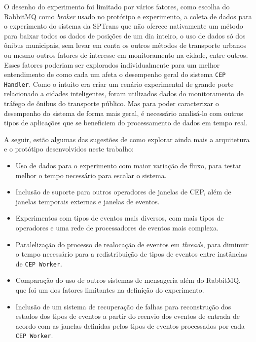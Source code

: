 O desenho do experimento foi limitado por vários fatores, como escolha do RabbitMQ como \textit{broker} usado no protótipo e experimento, a coleta de dados para o experimento do sistema da SPTrans que não oferece nativamente um método para baixar todos os dados de posições de um dia inteiro, o uso de dados só dos ônibus municipais, sem levar em conta os outros métodos de transporte urbanos ou mesmo outros fatores de interesse em monitoramento na cidade, entre outros. Esses fatores poderiam ser explorados individualmente para um melhor entendimento de como cada um afeta o desempenho geral do sistema  \texttt{CEP Handler}. %
Como o intuito era criar um cenário experimental de grande porte relacionado a cidades inteligentes, foram utilizados dados do monitoramento de tráfego de ônibus do transporte público. Mas para poder caracterizar o desempenho do sistema de forma mais geral, é necessário analisá-lo com outros tipos de aplicações que se beneficiem do processamento de dados em tempo real. 

A seguir, estão algumas das sugestões de como explorar ainda mais a arquitetura e o protótipo desenvolvidos neste trabalho:

\begin{itemize}
    \item Uso de dados para o experimento com maior variação de fluxo, para testar melhor o tempo necessário para escalar o sistema.
    \item Inclusão de suporte para outros operadores de janelas de CEP, além de janelas temporais externas e janelas de eventos.
    \item Experimentos com tipos de eventos mais diversos, com mais tipos de operadores e uma rede de processadores de eventos mais complexa.
    \item Paralelização do processo de realocação de eventos em \textit{threads}, para diminuir o tempo necessário para a redistribuição de tipos de eventos entre instâncias de \texttt{CEP Worker}.
    \item Comparação do uso de outros sistemas de mensageria além do RabbitMQ, que foi um dos fatores limitantes na definição do experimento.
    \item Inclusão de um sistema de recuperação de falhas para reconstrução dos estados dos tipos de eventos a partir do reenvio dos eventos de entrada de acordo com as janelas definidas pelos tipos de eventos processados por cada \texttt{CEP Worker}.
\end{itemize}

